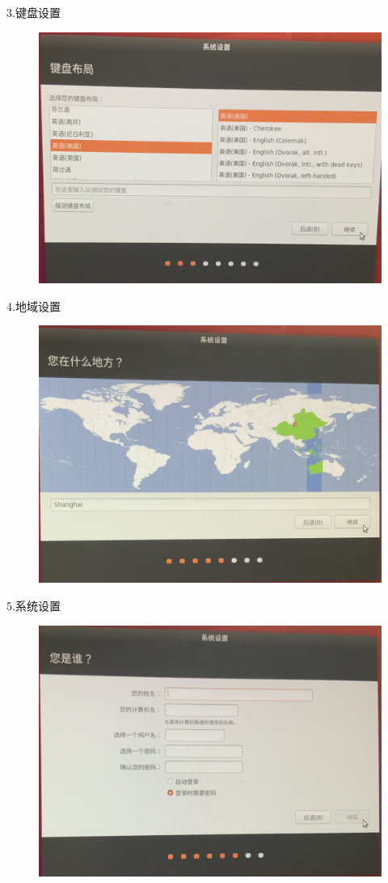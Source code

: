 \documentclass[openbib]{article}
\begin{document}
3.键盘设置
\begin{figure}[H]
	\centering
	\includegraphics[scale=0.3]{03}
\end{figure}

4.地域设置
\begin{figure}[H]
	\centering
	\includegraphics[scale=0.3]{04}
\end{figure}

5.系统设置
\begin{figure}[H]
	\centering
	\includegraphics[scale=0.3]{06}
\end{figure}
\end{document}
